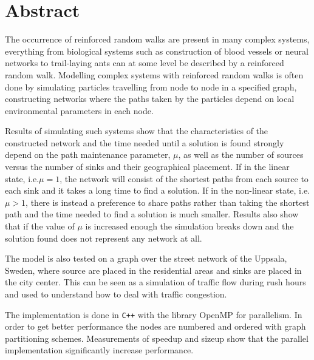 \section*{Abstract}
\label{sec:abstract}

The occurrence of reinforced random walks are present in many complex systems, everything from biological systems such as construction of blood vessels or neural networks to trail-laying ants can at some level be described by a reinforced random walk. Modelling complex systems with reinforced random walks is often done by simulating particles travelling from node to node in a specified graph, constructing networks where the paths taken by the particles depend on local environmental parameters in each node.

Results of simulating such systems show that the characteristics of the constructed network and the time needed until a solution is found strongly depend on the path maintenance parameter, $\mu$, as well as the number of sources versus the number of sinks and their geographical placement. If in the linear state, i.e.\@ $\mu = 1$, the network will consist of the shortest paths from each source to each sink and it takes a long time to find a solution. If in the non-linear state, i.e.\@ $\mu > 1$, there is instead a preference to share paths rather than taking the shortest path and the time needed to find a solution is much smaller. Results also show that if the value of $\mu$ is increased enough the simulation breaks down and the solution found does not represent any network at all. 

The model is also tested on a graph over the street network of the Uppsala, Sweden, where source are placed in the residential areas and sinks are placed in the city center. This can be seen as a simulation of traffic flow during rush hours and used to understand how to deal with traffic congestion.

The implementation is done in \texttt{C++} with the library OpenMP for parallelism. In order to get better performance the nodes are numbered and ordered with graph partitioning schemes. Measurements of speedup and sizeup show that the parallel implementation significantly increase performance. 